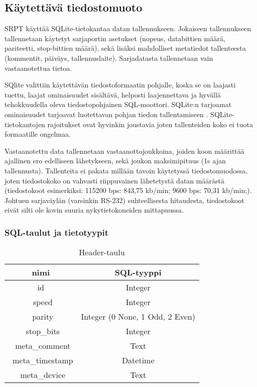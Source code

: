 \subsection{Käytettävä tiedostomuoto}
SRPT käyttää SQLite-tietokantaa datan tallennukseen. Jokaiseen tallennukseen tallennetaan käytetyt sarjaportin asetukset (nopeus, databittien määrä, pariteetti, stop-bittien määrä), sekä lisäksi mahdolliset metatiedot tallenteesta (kommentit, päiväys, tallennuslaite). Sarjadatasta tallennetaan vain vastaanotettua tietoa.

SQlite valittiin käytettävän tiedostoformaatin pohjalle, koska se on laajasti tuettu, laajat ominaisuudet sisältävä, helposti laajennettava ja hyvällä tehokkuudella oleva tiedostopohjainen SQL-moottori. SQLite:n tarjoamat ominaisuudet tarjoavat luotettavan pohjan tiedon tallentamiseen \cite{sqlite:appfileformat}. SQLite-tietokantojen rajoitukset ovat hyvinkin joustavia joten tallenteiden koko ei tuota formaatille ongelmaa.

Vastaanotettu data tallennetaan vastaanottojoukkoina, joiden koon määrittää ajallinen ero edelliseen lähetykseen, sekä joukon maksimipituus (1s ajan tallennusta). Tallenteita ei pakata millään tavoin käytetyssä tiedostomuodossa, joten tiedostokoko on vahvasti riippuvainen lähetetystä datan määrästä (tiedostokoot esimerkiksi: 115200 bps: 843,75 kb/min; 9600 bps: 70,31 kb/min;). Johtuen sarjaväylän (varsinkin RS-232) suhteellisesta hitaudesta, tiedostokoot eivät silti ole kovin suuria nykytietokoneiden mittapuussa.


\subsubsection{SQL-taulut ja tietotyypit}

\begin{table}[h]
\caption{Header-taulu}
\begin{tabular}{ c|c }
\centering
nimi & SQL-tyyppi \\\toprule
id & Integer \\\
speed & Integer \\\
parity & Integer (0 None, 1 Odd, 2 Even) \\\
stop\_bits & Integer \\\
meta\_comment & Text \\\
meta\_timestamp & Datetime \\\
meta\_device & Text \\\bottomrule
\end{tabular}
\end{table}

